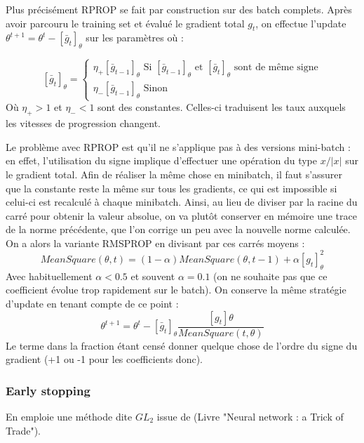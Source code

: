 \documentclass[conference]{IEEEtran}
\begin{document}
Plus précisément RPROP se fait par construction sur des batch complets. Après avoir parcouru le training set et évalué le gradient total $g_t$, on effectue l'update $\theta^{t+1}=\theta^t-[\bar{g}_t]_\theta$ sur les paramètres où :

$$
[\bar{g}_t]_\theta=\left\{
\begin{array}{l}
\eta_+[\bar{g}_{t-1}]_\theta \mbox{ Si $[\bar{g}_{t-1}]_\theta$ et $[\bar{g}_{t}]_\theta$ sont de même signe} \\
\eta_-[\bar{g}_{t-1}]_\theta \mbox{ Sinon} 
\end{array}
\right.
$$
Où $\eta_+>1$ et $\eta_-<1$ sont des constantes. Celles-ci traduisent les taux auxquels les vitesses de progression changent.

Le problème avec RPROP est qu'il ne s'applique pas à des versions mini-batch : en effet, l'utilisation du signe implique d'effectuer une opération du type $x/|x|$ sur le gradient total. Afin de réaliser la même chose en minibatch, il faut s'assurer que la constante reste la même sur tous les gradients, ce qui est impossible si celui-ci est recalculé à chaque minibatch. Ainsi, au lieu de diviser par la racine du carré pour obtenir la valeur absolue, on va plutôt conserver en mémoire une trace de la norme précédente, que l'on corrige un peu avec la nouvelle norme calculée. On a alors la variante RMSPROP en divisant par ces carrés moyens :
$$MeanSquare(\theta,t)=(1-\alpha)MeanSquare(\theta,t-1)+\alpha [g_t]_\theta^2$$
Avec habituellement $\alpha<0.5$ et souvent $\alpha=0.1$ (on ne souhaite pas que ce coefficient évolue trop rapidement sur le batch). On conserve la même stratégie d'update en tenant compte de ce point :
$$\theta^{t+1}=\theta^t-[\bar{g}_t]_\theta\frac{[g_t]\theta}{MeanSquare(t,\theta)}$$
Le terme dans la fraction étant censé donner quelque chose de l'ordre du signe du gradient (+1 ou -1 pour les coefficients donc).

\subsubsection{Early stopping}
En emploie une méthode dite $GL_2$ issue de \cite{Prechelt97earlystopping} (Livre "Neural network : a Trick of Trade").
\end{document}
